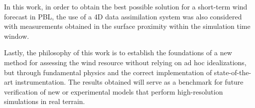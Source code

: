 In this work, in order to obtain the best possible solution for a short-term wind forecast in PBL, the use of a 4D data assimilation system was also considered with measurements obtained in the surface proximity within the simulation time window.

Lastly, the philosophy of this work is to establish the foundations of a new method for assessing the wind resource without relying on ad hoc idealizations, but through fundamental physics and the correct implementation of state-of-the-art instrumentation. The results obtained will serve as a benchmark for future verification of new or experimental models that perform high-resolution simulations in real terrain.